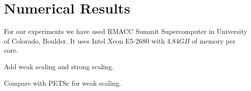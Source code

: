 \section{Numerical Results}
\label{sec:results}

For our experiments we have used RMACC Summit Supercomputer in University of Colorado, Boulder. It uses Intel Xeon E5-2680 with $4.84GB$ of memory per core.

Add weak scaling and strong scaling.

Compare with PETSc for weak scaling.

